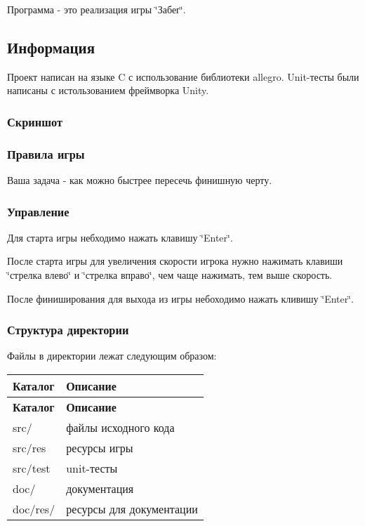 Программа -\/ это реализация игры \char`\"{}Забег\char`\"{}.

\subsection*{Информация}

Проект написан на языке C с использование библиотеки allegro. Unit-\/тесты были написаны с истользованием фреймворка Unity.

\subsubsection*{Скриншот}



\subsubsection*{Правила игры}

Ваша задача -\/ как можно быстрее пересечь финишную черту.

\subsubsection*{Управление}

Для старта игры небходимо нажать клавишу \char`\"{}\+Enter\char`\"{}.

После старта игры для увеличения скорости игрока нужно нажимать клавиши \char`\"{}стрелка влево\char`\"{} и \char`\"{}стрелка вправо\char`\"{}, чем чаще нажимать, тем выше скорость.

После финиширования для выхода из игры небоходимо нажать кливишу \char`\"{}\+Enter\char`\"{}.

\subsubsection*{Структура директории}

Файлы в директории лежат следующим образом\+:

\tabulinesep=1mm
\begin{longtabu} spread 0pt [c]{*{2}{|X[-1]}|}
\hline
\rowcolor{\tableheadbgcolor}\textbf{ Каталог }&\textbf{ Описание  }\\
\endfirsthead
\hline
\endfoot
\hline
\rowcolor{\tableheadbgcolor}\textbf{ Каталог }&\textbf{ Описание  }\\
\endhead
src/ &файлы исходного кода \\
src/res &ресурсы игры \\
src/test &unit-\/тесты \\
doc/ &документация \\
doc/res/ &ресурсы для документации \\
\end{longtabu}
